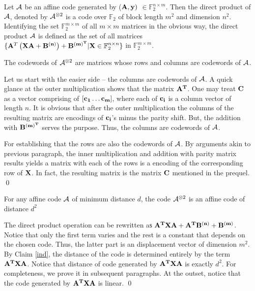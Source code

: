 { \begin{definition}
   Let ${\cal A}$ be an affine code generated by (${\bf A, y})$ $\in
   \mathbb{F}_2^{n \times m}$.  Then the direct product of ${\cal A}$,
   denoted by ${\cal A}^{\otimes 2}$ is a code over $\mathbb{F}_2$ of block
   length $m^2$ and dimension $n^2$. Identifying the set
   $\mathbb{F}_2^{m \times m}$ of all $m \times m$ matrices in the
   obvious way, the direct product ${\cal A}$ is defined as the set of all
   matrices $\{ {\bf A}^T \left({\bf X A + B^{(n)} } \right) + {\bf
     B^{(m)^{T}}} | {\bf X} \in \mathbb{F}_2^{n \times n} \}$ in
   $\mathbb{F}_2^{m \times m}$.
 \end{definition}

 \begin{claim}
   The codewords of ${\cal A} ^{\otimes 2}$ are matrices whose rows and
   columns are codewords of ${\cal A}$.
 \end{claim} 
    Let us start with
 the easier side -- the columns are codewords of ${\cal A}$. A quick glance
 at the outer multiplication shows that the matrix ${\bf A^{T}}$. One
 may treat ${\bf C}$ as a vector comprising of $[{\bf c_1 \ldots
   c_m}]$, where each of ${\bf c_i}$ is a column vector of length
 $n$. It is obvious that after the outer multiplication the columns of
 the resulting matrix are encodings of ${\bf c_i}$'s minus the parity
 shift. But, the addition with ${\bf B^{(m)^{T}}}$ serves the
 purpose. Thus, the columns are codewords of ${\cal A}$.

 For establishing that the rows are also the codewords of ${\cal A}$. By
 arguments akin to previous paragraph, the inner multiplication and
 addition with parity matrix results yields a matrix with each of the
 rows is a encoding of the corresponding row of ${\bf X}$. In fact,
 the resulting matrix is the matrix ${\bf C}$ mentioned in the
 prequel. \qed



\begin{claim}\label{fin}
For any affine code ${\cal A}$ of minimum distance $d$, the code ${\cal A}^{\otimes 2}$ is an affine code of
distance $d^2$
\end{claim}
 The direct product operation can be rewritten aѕ
${\bf A^T X A} + {\bf A^T B^{(n)}} + {\bf B^{(m)}}$.  Notice that only
the first term varies and the rest is a constant that depends on the
chosen code.  Thus, the latter part is an displacement vector of
dimension $m^2$. By Claim \ref{ind}, the distance of the code is
determined entirely by the term ${\bf A^T X A}$. Notice that distance
of code generated by ${\bf A^T X A}$ is exactly $d^2$. For
completeness, we prove it in subsequent paragraphs.  At the outset,
notice that the code generated by ${\bf A^TXA}$ is linear. \qed


}
